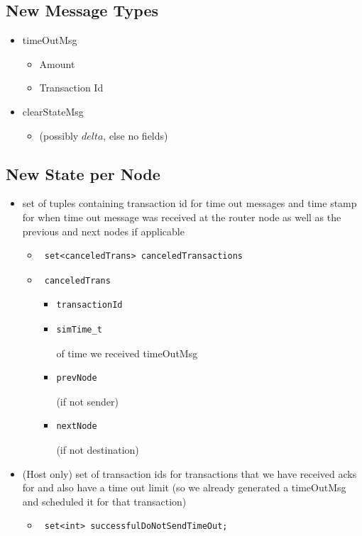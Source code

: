 \documentclass[a4paper]{article}
\begin{document}
\subsection{New Message Types}
\begin{itemize}
    \item timeOutMsg
    \begin{itemize}
        \item Amount
        \item Transaction Id
    \end{itemize}
    \item clearStateMsg
    \begin{itemize}
        \item (possibly $delta$, else no fields)
    \end{itemize}
\end{itemize}
\subsection{New State per Node}
\begin{itemize}
    \item set of tuples containing transaction id for time out messages and time stamp for when time out message was received at the router node as well as the previous and next nodes if applicable 
\begin{itemize}
    \item \begin{verbatim} set<canceledTrans> canceledTransactions \end{verbatim}
    \item \begin{verbatim} canceledTrans \end{verbatim}
    \begin{itemize}
        \item \begin{verbatim}transactionId \end{verbatim}
        \item  \begin{verbatim}simTime_t\end{verbatim} of time we received timeOutMsg 
        \item \begin{verbatim}prevNode  \end{verbatim} (if not sender)
        \item \begin{verbatim}nextNode \end{verbatim} (if not destination)
    \end{itemize}
\end{itemize} 
\item (Host only)  set of transaction ids for transactions that we have received acks for and also have a time out limit (so we already generated a timeOutMsg and scheduled it for that transaction)
\begin{itemize}
    \item \begin{verbatim} set<int> successfulDoNotSendTimeOut; \end{verbatim}
\end{itemize}


\end{itemize}
\end{document}
